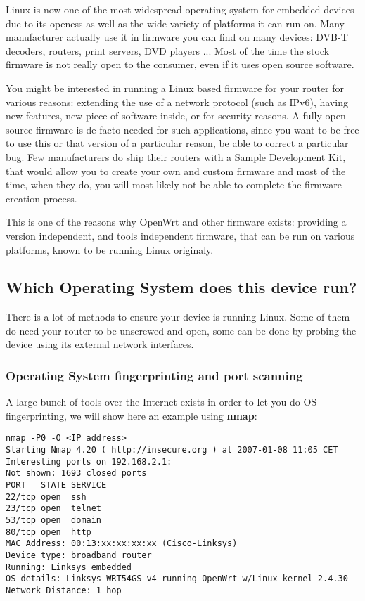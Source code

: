 Linux is now one of the most widespread operating system for embedded devices due
to its openess as well as the wide variety of platforms it can run on. Many
manufacturer actually use it in firmware you can find on many devices: DVB-T 
decoders, routers, print servers, DVD players ... Most of the time the stock 
firmware is not really open to the consumer, even if it uses open source software.

You might be interested in running a Linux based firmware for your router for
various reasons: extending the use of a network protocol (such as IPv6), having
new features, new piece of software inside, or for security reasons. A fully 
open-source firmware is de-facto needed for such applications, since you want to
be free to use this or that version of a particular reason, be able to correct a
particular bug. Few manufacturers do ship their routers with a Sample Development Kit,
that would allow you to create your own and custom firmware and most of the time,
when they do, you will most likely not be able to complete the firmware creation process.

This is one of the reasons why OpenWrt and other firmware exists: providing a 
version independent, and tools independent firmware, that can be run on various 
platforms, known to be running Linux originaly.

\subsection{Which Operating System does this device run?}

There is a lot of methods to ensure your device is running Linux. Some of them do
need your router to be unscrewed and open, some can be done by probing the device
using its external network interfaces.

\subsubsection{Operating System fingerprinting and port scanning}

A large bunch of tools over the Internet exists in order to let you do OS 
fingerprinting, we will show here an example using \textbf{nmap}:

\begin{Verbatim}
nmap -P0 -O <IP address>
Starting Nmap 4.20 ( http://insecure.org ) at 2007-01-08 11:05 CET
Interesting ports on 192.168.2.1:
Not shown: 1693 closed ports
PORT   STATE SERVICE
22/tcp open  ssh
23/tcp open  telnet
53/tcp open  domain
80/tcp open  http
MAC Address: 00:13:xx:xx:xx:xx (Cisco-Linksys)
Device type: broadband router
Running: Linksys embedded
OS details: Linksys WRT54GS v4 running OpenWrt w/Linux kernel 2.4.30
Network Distance: 1 hop
\end{Verbatim}

